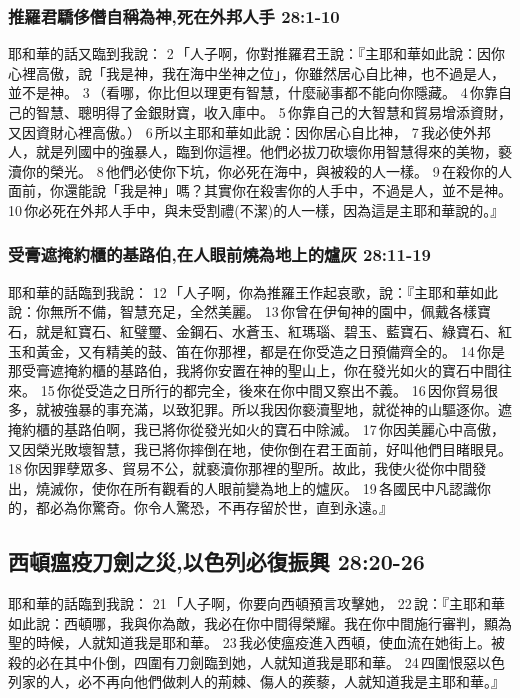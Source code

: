 \subsubsection{推羅君驕侈僭自稱為神,死在外邦人手 28:1-10}
耶和華的話又臨到我說： 2 「人子啊，你對推羅君王說：『主耶和華如此說：因你心裡高傲，說「我是神，我在海中坐神之位」，你雖然居心自比神，也不過是人，並不是神。 3 （看哪，你比但以理更有智慧，什麼祕事都不能向你隱藏。 4 你靠自己的智慧、聰明得了金銀財寶，收入庫中。 5 你靠自己的大智慧和貿易增添資財，又因資財心裡高傲。） 6 所以主耶和華如此說：因你居心自比神， 7 我必使外邦人，就是列國中的強暴人，臨到你這裡。他們必拔刀砍壞你用智慧得來的美物，褻瀆你的榮光。 8 他們必使你下坑，你必死在海中，與被殺的人一樣。 9 在殺你的人面前，你還能說「我是神」嗎？其實你在殺害你的人手中，不過是人，並不是神。 10 你必死在外邦人手中，與未受割禮(不潔)的人一樣，因為這是主耶和華說的。』

\subsubsection{受膏遮掩約櫃的基路伯,在人眼前燒為地上的爐灰 28:11-19}
耶和華的話臨到我說： 12 「人子啊，你為推羅王作起哀歌，說：『主耶和華如此說：你無所不備，智慧充足，全然美麗。 13 你曾在伊甸神的園中，佩戴各樣寶石，就是紅寶石、紅璧璽、金鋼石、水蒼玉、紅瑪瑙、碧玉、藍寶石、綠寶石、紅玉和黃金，又有精美的鼓、笛在你那裡，都是在你受造之日預備齊全的。 14 你是那受膏遮掩約櫃的基路伯，我將你安置在神的聖山上，你在發光如火的寶石中間往來。 15 你從受造之日所行的都完全，後來在你中間又察出不義。 16 因你貿易很多，就被強暴的事充滿，以致犯罪。所以我因你褻瀆聖地，就從神的山驅逐你。遮掩約櫃的基路伯啊，我已將你從發光如火的寶石中除滅。 17 你因美麗心中高傲，又因榮光敗壞智慧，我已將你摔倒在地，使你倒在君王面前，好叫他們目睹眼見。 18 你因罪孽眾多、貿易不公，就褻瀆你那裡的聖所。故此，我使火從你中間發出，燒滅你，使你在所有觀看的人眼前變為地上的爐灰。 19 各國民中凡認識你的，都必為你驚奇。你令人驚恐，不再存留於世，直到永遠。』

\subsection{西頓瘟疫刀劍之災,以色列必復振興 28:20-26}
耶和華的話臨到我說： 21 「人子啊，你要向西頓預言攻擊她， 22 說：『主耶和華如此說：西頓哪，我與你為敵，我必在你中間得榮耀。我在你中間施行審判，顯為聖的時候，人就知道我是耶和華。 23 我必使瘟疫進入西頓，使血流在她街上。被殺的必在其中仆倒，四圍有刀劍臨到她，人就知道我是耶和華。 24 四圍恨惡以色列家的人，必不再向他們做刺人的荊棘、傷人的蒺藜，人就知道我是主耶和華。』

